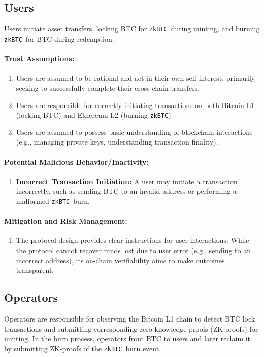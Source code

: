 \documentclass{DESSThesis}
\newcommand{\zktoken}{\texttt{zkBTC}}
\begin{document}
\subsection{Users}
Users initiate asset transfers, locking BTC for \zktoken\ during minting, and burning \zktoken\ for BTC during redemption.

\paragraph{Trust Assumptions:}
\begin{enumerate}
	\item Users are assumed to be rational and act in their own self-interest, primarily seeking to successfully complete their cross-chain transfers.
	\item Users are responsible for correctly initiating transactions on both Bitcoin L1 (locking BTC) and Ethereum L2 (burning \zktoken).
	\item Users are assumed to possess basic understanding of blockchain interactions (e.g., managing private keys, understanding transaction finality).
\end{enumerate}

\paragraph{Potential Malicious Behavior/Inactivity:}
\begin{enumerate}
\item \textbf{Incorrect Transaction Initiation:} A user may initiate a transaction incorrectly, such as sending BTC to an invalid address or performing a malformed \zktoken\ burn.
\end{enumerate}

\paragraph{Mitigation and Risk Management:}
\begin{enumerate}
\item The protocol design provides clear instructions for user interactions. While the protocol cannot recover funds lost due to user error (e.g., sending to an incorrect address), its on-chain verifiability aims to make outcomes transparent.
\end{enumerate}


\subsection{Operators}
Operators are responsible for observing the Bitcoin L1 chain to detect BTC lock transactions and submitting corresponding zero-knowledge proofs (ZK-proofs) for minting. In the burn process, operators front BTC to users and later reclaim it by submitting ZK-proofs of the \zktoken\ burn event.
\end{document}
